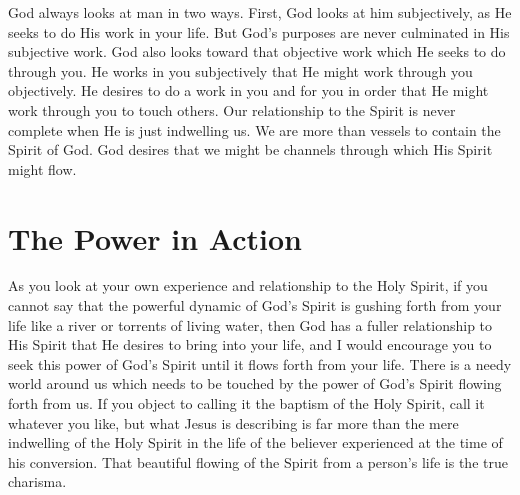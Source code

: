 God always looks at man in two ways. First, God looks at him subjectively, as He seeks to do His work in your life. But God's purposes are never culminated in His subjective work. God also looks toward that objective work which He seeks to do through you. He works in you subjectively that He might work through you objectively. He desires to do a work in you and for you in order that He might work through you to touch others. Our relationship to the Spirit is never complete when He is just indwelling us. We are more than vessels to contain the Spirit of God. God desires that we might be channels through which His Spirit might flow. 

\section*{The Power in Action}

As you look at your own experience and relationship to the Holy Spirit, if you cannot say that the powerful dynamic of God's Spirit is gushing forth from your life like a river or torrents of living water, then God has a fuller relationship to His Spirit that He desires to bring into your life, and I would encourage you to seek this power of God's Spirit until it flows forth from your life. There is a needy world around us which needs to be touched by the power of God's Spirit flowing forth from us. If you object to calling it the baptism of the Holy Spirit, call it whatever you like, but what Jesus is describing is far more than the mere indwelling of the Holy Spirit in the life of the believer experienced at the time of his conversion. That beautiful flowing of the Spirit from a person's life is the true charisma. 



